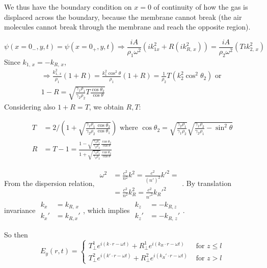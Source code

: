 \documentclass[twoside,10pt]{amsart}
\newcommand{\problemhead}[1]
  {\smallskip
   \noindent{\large\bf Problem #1.}
   \smallskip}
\begin{document}
We thus have the boundary condition on $x=0$ of continuity of how the gas is displaced across the boundary, because the membrane cannot break (the air molecules cannot break through the membrane and reach the opposite region).  

\[
\psi(x=0_-,y,t) = \psi(x=0_+,y,t) \Longrightarrow \frac{iA}{ \rho_1 \omega^2 } ( i k_{1x}^2 + R (ik_{R,\,x}^2 )) = \frac{ iA}{\rho_2 \omega^2} (T i k_{2,\,x}^2) 
\]
Since $k_{1,\, x} = -k_{R,\, x}$, 
\[
\begin{gathered}
\Longrightarrow \frac{k_{1,\, x}^2}{\rho_1} (1 +R) = \frac{k_1^2 \cos^2{\theta} }{ \rho_1} (1 +R) = \frac{1}{ \rho_2} T ( k_2^2 \cos^2{\theta_2} ) \text{ or } \\
1 - R = \sqrt{ \frac{ \gamma_1 \rho_1 }{ \gamma_2 \rho_2 } T \frac{ \cos{\theta_2} }{ \cos{\theta}} }
\end{gathered}
\]
Considering also $1+R = T$, we obtain $R,T$:

\[
\boxed{ 
\begin{aligned}
  T & = 2 / \left( 1 + \sqrt{ \frac{ \gamma_1 \rho_1}{ \gamma_2 \rho_2 } \frac{ \cos{\theta_2}}{ \cos{\theta_1} } }\right) \text{ where } \cos{\theta_2} = \sqrt{ \frac{ \gamma_2 \rho_1}{ \gamma_1 \rho_2 } } \sqrt{ \frac{ \gamma_1 \rho_2}{ \gamma_2 \rho_1 } - \sin^2{\theta} } \\ 
  R & = T - 1 = \frac{ 1 - \sqrt{ \frac{ \gamma_1 \rho_1}{ \gamma_2 \rho_2 } } \frac{ \cos{\theta_2}}{\cos{\theta} } }{ 1 + \sqrt{ \frac{ \gamma_1 \rho_1}{ \gamma_2 \rho_2}} \frac{ \cos{\theta_2} }{ \cos{\theta} } }
\end{aligned} }
\]

\problemhead{12.1} From the dispersion relation, $\begin{aligned} \omega^2 & = \frac{c^2}{n^2} k^2 = \frac{c^2}{(n')^2} k'^2 = \\ & = \frac{c^2}{n^2} k_R^2 = \frac{c^2}{n'^2} k_R'^2 \end{aligned}$.  By translation invariance $\begin{aligned} k_x & = k_{R,\, x} \\ k_x' & = k_{R,x}' \end{aligned}$, which implies $\begin{aligned} k_z & = -k_{R,z} \\ k_z' & = -k_{R, \, z}' \end{aligned}$.  

So then
\[
E_y(r,t) = \begin{cases} T_{\perp}^1 e^{i (k\cdot r - \omega t) } + R_{\perp}^1 e^{i (k_R \cdot r - \omega t )} & \text{  for } z \leq l \\ T_{\perp}^2 e^{ i (k'\cdot r - \omega t) } + R_{\perp}^2 e^{ i (k_R' \cdot r - \omega t) } & \text{ for } z > l \end{cases}
\]
\end{document}

